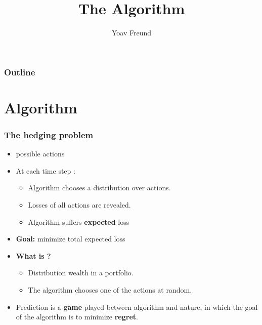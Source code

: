 \documentclass{beamer}
\title[\ouralg] %
{The \ouralg Algorithm}
\author[Freund] %
{Yoav Freund}
\institute[Universities of Somewhere and Elsewhere] %
\newcommand{\R}[1]{{\color{red}{#1}}}
\begin{document}

\begin{frame}
  \titlepage
\end{frame}

\begin{frame}
  \frametitle{Outline}
  \tableofcontents[pausesections]
\end{frame}

\section{\ouralg Algorithm}

\begin{frame}
\frametitle{The hedging problem}

\begin{itemize}
\item \R{$N$} possible actions 

\item At each time step \R{$t=1,2,\ldots,T$}:
\begin{itemize}
\item Algorithm chooses a distribution \R{$\distvec{t}$} over actions.
\item Losses \R{$0 \leq \cost{t}{i} \leq 1$} of all actions \R{$i=1,\ldots,N$} are revealed.
\item Algorithm suffers {\bf expected} loss \R{$\distvec{t} \cdot \costvec{t}$}
\end{itemize}
\item {\bf Goal:} minimize total expected loss
\item {\bf What is \R{$\distvec{t}$}?}
  \begin{itemize}
    \item Distribution wealth in a portfolio.
    \item The algorithm chooses one of the actions at random.
  \end{itemize}
\item Prediction is a {\bf game} played between algorithm and nature,
  in which the goal of the algorithm is to minimize {\bf regret}.
\end{itemize}
\end{frame}
\end{document}
